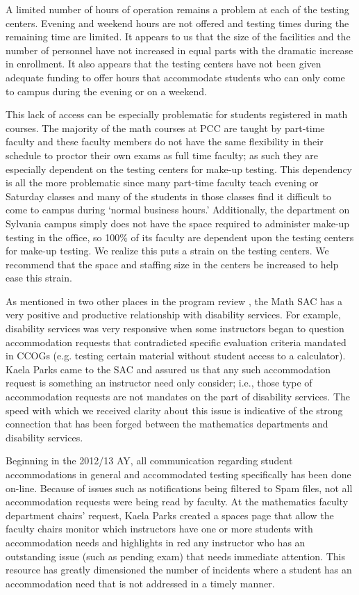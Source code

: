 A limited number of hours of operation remains a problem at each of the testing centers.   Evening and weekend hours are not offered and testing times during the remaining time are limited.  It appears to us that the size of  the facilities and the number of personnel  have not increased in equal parts with the dramatic increase in enrollment.   It also appears that the testing centers have not been given adequate funding to offer hours that accommodate students who can only come to campus during the evening or on a weekend.

This lack of access can be especially problematic for students registered in math courses.  The majority of the math courses at PCC are taught by part-time faculty and these faculty members do not have the same flexibility in their schedule to proctor their own exams as full time faculty; as such they are especially dependent on the testing centers for make-up testing. This dependency is all the more problematic since many part-time faculty teach evening or Saturday classes and many of the students in those classes find it difficult to come to campus during `normal business hours.' Additionally, the department on Sylvania campus simply does not have the space required to administer make-up testing in the office, so 100\% of its faculty are dependent upon the testing centers for make-up testing.   We realize this puts a strain on the testing centers.  We recommend that the space and staffing size in the centers be increased to help ease this strain.

As mentioned in two other places in the program review , the Math SAC has a very positive and productive relationship with disability services.  For example, disability services was very responsive when some instructors began to question accommodation requests that contradicted specific evaluation criteria mandated in CCOGs (e.g. testing certain material without student access to a calculator).  Kaela Parks came to the SAC and assured us that any such accommodation request is something an instructor need only consider; i.e., those type of accommodation requests are not mandates on the part of disability services.  The speed with which we received clarity about this issue is indicative of the strong connection that has been forged between the mathematics departments and disability services.

Beginning in the 2012/13 AY, all communication regarding student accommodations in general and accommodated testing specifically has been done on-line.  Because of issues such as notifications being filtered to Spam files, not all accommodation requests were being read by faculty.  At the  mathematics faculty department chairs' request, Kaela Parks created a spaces page that allow the faculty chairs monitor which instructors have one or more students with accommodation needs and highlights in red any instructor who has an outstanding issue (such as pending exam) that needs immediate attention.  This resource has greatly dimensioned the number of incidents where a student has an accommodation need that is not addressed in a timely manner.

